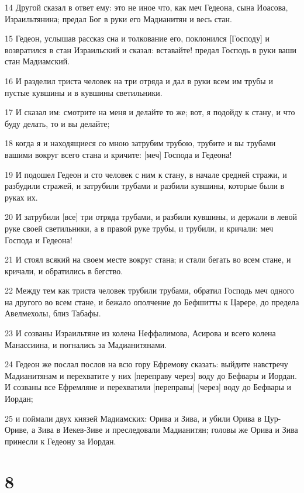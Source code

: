 \par 14 Другой сказал в ответ ему: это не иное что, как меч Гедеона, сына Иоасова, Израильтянина; предал Бог в руки его Мадианитян и весь стан.
\par 15 Гедеон, услышав рассказ сна и толкование его, поклонился [Господу] и возвратился в стан Израильский и сказал: вставайте! предал Господь в руки ваши стан Мадиамский.
\par 16 И разделил триста человек на три отряда и дал в руки всем им трубы и пустые кувшины и в кувшины светильники.
\par 17 И сказал им: смотрите на меня и делайте то же; вот, я подойду к стану, и что буду делать, то и вы делайте;
\par 18 когда я и находящиеся со мною затрубим трубою, трубите и вы трубами вашими вокруг всего стана и кричите: [меч] Господа и Гедеона!
\par 19 И подошел Гедеон и сто человек с ним к стану, в начале средней стражи, и разбудили стражей, и затрубили трубами и разбили кувшины, которые были в руках их.
\par 20 И затрубили [все] три отряда трубами, и разбили кувшины, и держали в левой руке своей светильники, а в правой руке трубы, и трубили, и кричали: меч Господа и Гедеона!
\par 21 И стоял всякий на своем месте вокруг стана; и стали бегать во всем стане, и кричали, и обратились в бегство.
\par 22 Между тем как триста человек трубили трубами, обратил Господь меч одного на другого во всем стане, и бежало ополчение до Бефшитты к Царере, до предела Авелмехолы, близ Табафы.
\par 23 И созваны Израильтяне из колена Неффалимова, Асирова и всего колена Манассиина, и погнались за Мадианитянами.
\par 24 Гедеон же послал послов на всю гору Ефремову сказать: выйдите навстречу Мадианитянам и перехватите у них [переправу через] воду до Бефвары и Иордан. И созваны все Ефремляне и перехватили [переправы] [через] воду до Бефвары и Иордан;
\par 25 и поймали двух князей Мадиамских: Орива и Зива, и убили Орива в Цур-Ориве, а Зива в Иекев-Зиве и преследовали Мадианитян; головы же Орива и Зива принесли к Гедеону за Иордан.

\chapter{8}

